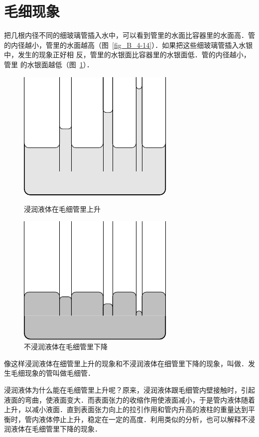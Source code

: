 \section{毛细现象}
把几根内径不同的细玻璃管插入水中，可以看到管里的水面比容器里的水面高．管的内径越小，管里的水面越高（图~\ref{fig_B_4-14}）．如果把这些细玻璃管插入水银中，发生的现象正好相
反，管里的水银面比容器里的水银面低．管的内径越小，管里
的水银面越低（图~\ref{fig_B_4-15}）．
\begin{figure}[htbp]
    \centering
    \begin{minipage}[t]{0.48\textwidth}
        \centering
        \includegraphics{fig/B/4-14.pdf}
        \caption{浸润液体在毛细管里上升}\label{fig_B_4-14}
    \end{minipage}
    \hfil
    \begin{minipage}[t]{0.48\textwidth}
        \centering
        \includegraphics{fig/B/4-15.pdf}
        \caption{不浸润液体在毛细管里下降}\label{fig_B_4-15}
    \end{minipage}
\end{figure}

像这样浸润液体在细管里上升的现象和不浸润液体在细管里下降的现象，叫做．发生毛细现象的管叫做毛细管．

浸润液体为什么能在毛细管里上升呢？原来，浸润液体跟毛细管内壁接触时，引起液面的弯曲，使液面变大．而表面张力的收缩作用使液面减小，于是管内液体随着上升，以减小液面．直到表面张力向上的拉引作用和管内升高的液柱的重量达到平衡时，管内液体停止上升，稳定在一定的高度．利用类似的分析，也可以解释不浸润液体在毛细管里下降的现象．

